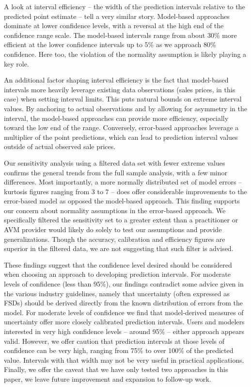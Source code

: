 \documentclass[colTwo]{anon}
\theoremstyle{definition}
\begin{document}
A look at interval efficiency -- the width of the prediction intervals relative to the predicted point estimate -- tell a very similar story. Model-based approaches dominate at lower confidence levels, with a reversal at the high end of the confidence range scale. The model-based intervals range from about 30\% more efficient at the lower confidence intervals up to 5\% as we approach 80\% confidence.  Here too, the violation of the normality assumption is likely playing a key role.

An additional factor shaping interval efficiency is the fact that model-based intervals more heavily leverage existing data observations (sales prices, in this case) when setting interval limits.  This puts natural bounds on extreme interval values.  By anchoring to actual observations and by allowing for asymmetry in the interval, the model-based approaches can provide more efficiency, especially toward the low end of the range. Conversely, error-based approaches leverage a multiplier of the point predictions, which can lead to prediction interval values outside of actual observed sale prices.

Our sensitivity analysis using a filtered data set with fewer extreme values confirms the general trends from the full sample analysis, with a few minor differences.  Most importantly, a more normally distributed set of model errors -- kurtosis figures ranging from 3 to 7 -- does offer considerable improvements to the error-based model as opposed the model-based approach.  This finding supports our concern about normality assumptions in the error-based approach.  We specifically filtered the sensitivity set to a greater extent than a practitioner or AVM provider would likely do solely to test our assumptions and provide generalizations.  Though the accuracy, calibration and efficiency figures are superior in the filtered data, we are not suggesting that such filter is advised.

These findings suggest that the confidence level desired should be considered when choosing an approach to developing prediction intervals.  For moderate levels of confidence (less than 95\%), our findings contradict some advice given in the various industry guidelines, namely that uncertainty (often expressed as FSDs) should be derived directly from the known distribution of errors from the model.  For moderate levels of confidence we find that model-derived measures of uncertainty offer more closely calibrated prediction intervals.  Users and modelers interested in very high confidence levels -- around 95\% -- either approach appears valid.  However, we offer caution that prediction intervals at those levels of confidence can be very high, ranging from 75\% to over 100\% of the predicted value.  Intervals with that width may not be very useful in practical applications.  Finally, we offer the caveat that we have only tested two approaches in this paper, we leave future improvement and expansion to follow-up work.
\end{document}
